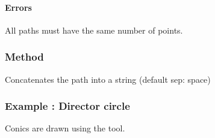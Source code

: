{\paragraph{Errors} All paths must have the same number of points.




\subsubsection{Method } %
\label{ssub:method_tkzmeth_path_concat}

Concatenates the path into a string (default sep: space)

\begin{tkzexample}[latex=.3\textwidth]
\end{tkzexample}


\subsubsection{Example : Director circle } %
\label{ssub:director_circle}


Conics are drawn using the  tool.


}
